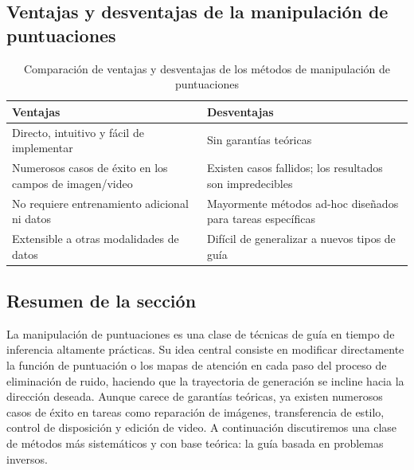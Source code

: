 \subsection{Ventajas y desventajas de la manipulación de puntuaciones}

\begin{table}[H]
\centering
\begin{tabular}{p{}p{}}
\toprule
\textbf{Ventajas} & \textbf{Desventajas} \\
\midrule
Directo, intuitivo y fácil de implementar & Sin garantías teóricas \\
Numerosos casos de éxito en los campos de imagen/video & Existen casos fallidos; los resultados son impredecibles \\
No requiere entrenamiento adicional ni datos & Mayormente métodos ad-hoc diseñados para tareas específicas \\
Extensible a otras modalidades de datos & Difícil de generalizar a nuevos tipos de guía \\
\bottomrule
\end{tabular}
\caption{Comparación de ventajas y desventajas de los métodos de manipulación de puntuaciones}
\end{table}

\subsection{Resumen de la sección}

La manipulación de puntuaciones es una clase de técnicas de guía en tiempo de inferencia altamente prácticas. Su idea central consiste en modificar directamente la función de puntuación o los mapas de atención en cada paso del proceso de eliminación de ruido, haciendo que la trayectoria de generación se incline hacia la dirección deseada. Aunque carece de garantías teóricas, ya existen numerosos casos de éxito en tareas como reparación de imágenes, transferencia de estilo, control de disposición y edición de video. A continuación discutiremos una clase de métodos más sistemáticos y con base teórica: la guía basada en problemas inversos.

